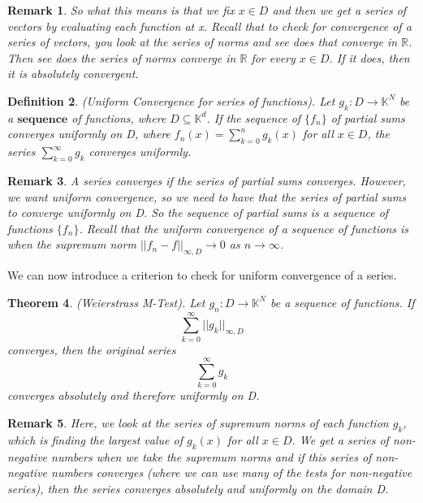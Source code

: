 \documentclass[twoside]{article}
\newcounter{lecnum}
\newtheorem{theorem}{Theorem}[lecnum]
\newtheorem{remark}[theorem]{Remark}
\newtheorem{definition}[theorem]{Definition}
\begin{document}
\begin{remark} So what this means is that we fix $x \in D$ and then we get a series of vectors by evaluating each function at x. Recall that to check for convergence of a series of vectors, you look at the series of norms and see does that converge in $\mathbb{R}$. Then see does the series of norms converge in $\mathbb{R}$ for every $x \in D$. If it does, then it is absolutely convergent.
\end{remark}

\begin{definition}(Uniform Convergence for series of functions). Let $g_k: D \rightarrow \mathbb{K}^N$ be a $\textbf{sequence}$ of functions, where $D \subseteq \mathbb{K}^d$. If the sequence of $\{f_n\}$ of partial sums converges uniformly on D, where $f_n(x) = \sum_{k=0}^{n}g_k(x)$ for all $x \in D$, the series $\sum_{k=0}^{\infty}g_k$ converges uniformly.
\end{definition}

\begin{remark} A series converges if the series of partial sums converges. However, we want uniform convergence, so we need to have that the series of partial sums to converge uniformly on D. So the sequence of partial sums is a sequence of functions $\{f_n\}$. Recall that the uniform convergence of a sequence of functions is when the supremum norm $||f_n - f||_{\infty,D} \rightarrow 0$ as $n \rightarrow \infty$.
\end{remark}

We can now introduce a criterion to check for uniform convergence of a series.

\begin{theorem}(Weierstrass M-Test). Let $g_n: D \rightarrow \mathbb{K}^N$ be a sequence of functions. If
$$
\sum_{k=0}^{\infty}||g_k||_{\infty, D}
$$
converges, then the original series
$$
\sum_{k=0}^{\infty}g_k
$$
converges absolutely and therefore uniformly on D.
\end{theorem}

\begin{remark} Here, we look at the series of supremum norms of each function $g_k$, which is finding the largest value of $g_k(x)$ for all $x \in D$. We get a series of non-negative numbers when we take the supremum norms and if this series of non-negative numbers converges (where we can use many of the tests for non-negative series), then the series converges absolutely and uniformly on the domain D. 
\end{remark}
\end{document}
